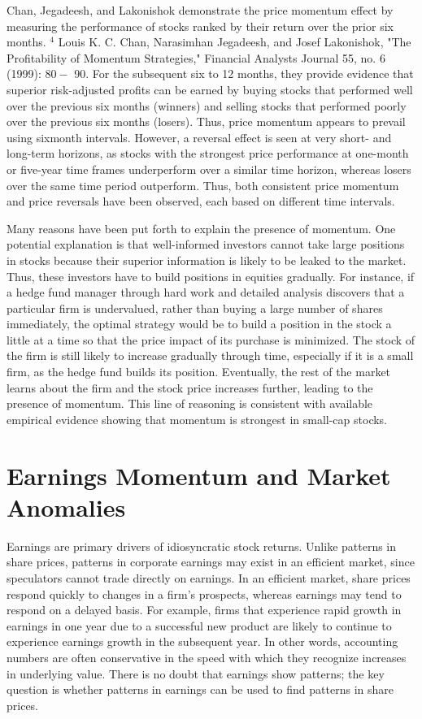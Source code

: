 \documentclass[11pt]{article}
\begin{document}
Chan, Jegadeesh, and Lakonishok demonstrate the price momentum effect by measuring the performance of stocks ranked by their return over the prior six months. ${ }^{4}$ Louis K. C. Chan, Narasimhan Jegadeesh, and Josef Lakonishok, "The Profitability of Momentum Strategies," Financial Analysts Journal 55, no. 6 (1999): $80-$ 90. For the subsequent six to 12 months, they provide evidence that superior risk-adjusted profits can be earned by buying stocks that performed well over the previous six months (winners) and selling stocks that performed poorly over the previous six months (losers). Thus, price momentum appears to prevail using sixmonth intervals. However, a reversal effect is seen at very short- and long-term horizons, as stocks with the strongest price performance at one-month or five-year time frames underperform over a similar time horizon, whereas losers over the same time period outperform. Thus, both consistent price momentum and price reversals have been observed, each based on different time intervals.

Many reasons have been put forth to explain the presence of momentum. One potential explanation is that well-informed investors cannot take large positions in stocks because their superior information is likely to be leaked to the market. Thus, these investors have to build positions in equities gradually. For instance, if a hedge fund manager through hard work and detailed analysis discovers that a particular firm is undervalued, rather than buying a large number of shares immediately, the optimal strategy would be to build a position in the stock a little at a time so that the price impact of its purchase is minimized. The stock of the firm is still likely to increase gradually through time, especially if it is a small firm, as the hedge fund builds its position. Eventually, the rest of the market learns about the firm and the stock price increases further, leading to the presence of momentum. This line of reasoning is consistent with available empirical evidence showing that momentum is strongest in small-cap stocks.

\section*{Earnings Momentum and Market Anomalies}
Earnings are primary drivers of idiosyncratic stock returns. Unlike patterns in share prices, patterns in corporate earnings may exist in an efficient market, since speculators cannot trade directly on earnings. In an efficient market, share prices respond quickly to changes in a firm's prospects, whereas earnings may tend to respond on a delayed basis. For example, firms that experience rapid growth in earnings in one year due to a successful new product are likely to continue to experience earnings growth in the subsequent year. In other words, accounting numbers are often conservative in the speed with which they recognize increases in underlying value. There is no doubt that earnings show patterns; the key question is whether patterns in earnings can be used to find patterns in share prices.
\end{document}
